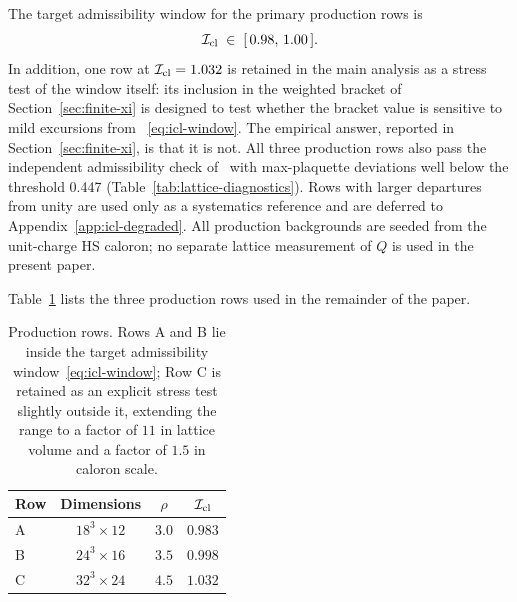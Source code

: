 \documentclass[a4paper,11pt]{article}
\theoremstyle{definition}
\newcommand{\Icl}{\mathcal{I}_{\rm cl}}
\begin{document}
The target admissibility window for the primary production rows is
\begin{equation}
\Icl \;\in\; [\,0.98,\,1.00\,].
\label{eq:icl-window}
\end{equation}
In addition, one row at $\Icl = 1.032$ is retained in the main
analysis as a stress test of the window itself: its inclusion in
the weighted bracket of Section~\ref{sec:finite-xi} is designed to
test whether the bracket value is sensitive to mild excursions from
~\eqref{eq:icl-window}. The empirical answer, reported in
Section~\ref{sec:finite-xi}, is that it is not. All three
production rows also pass the independent admissibility check
of~\cite{Luscher-admissibility} with max-plaquette deviations well
below the threshold 0.447
(Table~\ref{tab:lattice-diagnostics}). Rows with larger
departures from unity are used only as a systematics reference and
are deferred to Appendix~\ref{app:icl-degraded}. All production
backgrounds are seeded from the unit-charge HS caloron; no separate
lattice measurement of $Q$ is used in the present paper.

Table~\ref{tab:production-rows} lists the three production rows used
in the remainder of the paper.

\begin{table}[h]
\centering
\begin{tabular}{lccc}
\toprule
Row & Dimensions & $\rho$ & $\Icl$ \\
\midrule
A & $18^3 \times 12$ & $3.0$ & $0.983$ \\
B & $24^3 \times 16$ & $3.5$ & $0.998$ \\
C & $32^3 \times 24$ & $4.5$ & $1.032$ \\
\bottomrule
\end{tabular}
\caption{Production rows. Rows A and B lie inside the target
admissibility window~\eqref{eq:icl-window}; Row C is retained as an
explicit stress test slightly outside it, extending the range to a
factor of $11$ in lattice volume and a factor of $1.5$ in caloron
scale.}
\label{tab:production-rows}
\end{table}
\end{document}
